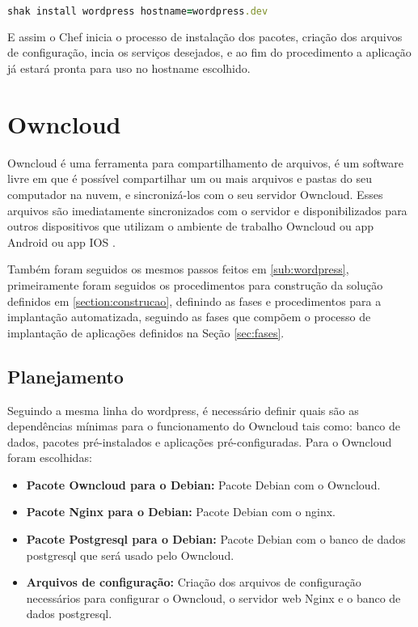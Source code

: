 \begin{lstlisting}[language=Ruby,label=dice_index,caption={Exemplo de exexução de instalação do wordpress com shak}]
shak install wordpress hostname=wordpress.dev
\end{lstlisting}

E assim o Chef inicia o processo de instalação dos pacotes, criação dos arquivos
de configuração, incia os serviços desejados, e ao fim do procedimento a aplicação
já estará pronta para uso no hostname escolhido.

\section{Owncloud}
\label{sub:owncloud}

Owncloud é uma ferramenta para compartilhamento de arquivos, é um software 
livre em que é possível compartilhar
um ou mais arquivos e pastas do seu computador na nuvem, e sincronizá-los com o seu
servidor Owncloud. Esses arquivos são imediatamente sincronizados com o servidor
e disponibilizados para outros dispositivos que utilizam o ambiente de trabalho
Owncloud ou app Android ou app IOS \cite{owncloud} .

Também foram seguidos os mesmos passos feitos em \ref{sub:wordpress}, primeiramente
foram seguidos os procedimentos para construção da solução definidos em \ref{section:construcao},
definindo as fases e procedimentos para a implantação automatizada, seguindo as
fases que compõem o processo de implantação de aplicações definidos na Seção
\ref{sec:fases}.

\subsection{Planejamento}

Seguindo a mesma linha do wordpress, é necessário definir quais são as dependências
mínimas para o funcionamento do Owncloud tais como: banco de dados, pacotes
pré-instalados e aplicações pré-configuradas. Para o Owncloud foram escolhidas:

\begin{itemize}
   \item \textbf{Pacote Owncloud para o Debian:} Pacote Debian com o Owncloud.
   \item \textbf{Pacote Nginx para o Debian:} Pacote Debian com o nginx.
   \item \textbf{Pacote Postgresql para o Debian:} Pacote Debian com o banco de dados postgresql
   que será usado pelo Owncloud.
   \item \textbf{Arquivos de configuração:} Criação dos arquivos de configuração
   necessários para configurar o Owncloud, o servidor web Nginx e o banco de dados
   postgresql.
\end{itemize}

